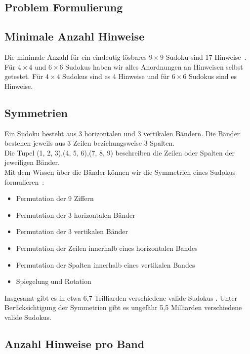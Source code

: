 \subsection{Problem Formulierung}

\subsection{Minimale Anzahl Hinweise}
Die minimale Anzahl für ein eindeutig lösbares $9 \times 9$ Sudoku sind 17 Hinweise~\cite{DBLP:journals/corr/abs-1201-0749}.
Für $4 \times 4$ und $6 \times 6$ Sudokus haben wir alles Anordnungen an Hinweisen selbst getestet.
Für $4 \times 4$ Sudokus sind es 4 Hinweise und für $6 \times 6$ Sudokus sind es %
Hinweise.

\subsection{Symmetrien}
Ein Sudoku besteht aus 3 horizontalen und 3 vertikalen Bändern. Die Bänder bestehen jeweils aus 3 Zeilen beziehungsweise 3 Spalten. \\
Die Tupel (1, 2, 3),(4, 5, 6),(7, 8, 9) beschreiben die Zeilen oder Spalten der jeweiligen Bänder. \\
Mit dem Wissen über die Bänder können wir die Symmetrien eines Sudokus formulieren~\cite{russell2006mathematics}: \\
\begin{itemize}
    \item Permutation der 9 Ziffern
    \item Permutation der 3 horizontalen Bänder
    \item Permutation der 3 vertikalen Bänder
    \item Permutation der Zeilen innerhalb eines horizontalen Bandes
    \item Permutation der Spalten innerhalb eines vertikalen Bandes
    \item Spiegelung und Rotation
\end{itemize}
Insgesamt gibt es in etwa 6,7 Trilliarden verschiedene valide Sudokus \cite{felgenhauer2006mathematics}. Unter Berücksichtigung der Symmetrien
gibt es ungefähr 5,5 Milliarden verschiedene valide Sudokus\cite{russell2006mathematics}. \\

\subsection{Anzahl Hinweise pro Band}

